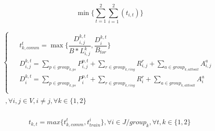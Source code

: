 \documentclass[conference]{IEEEtran}
\begin{document}
\begin{equation}
	\min\{\sum_{t=1}^{2}\sum_{i=1}^{2}(t_{i,t})\}
\end{equation}

\begin{equation}
	\begin{split}
		\begin{cases}
			\begin{aligned}
				& t_{k, comm}^{t} = \max\{\dfrac{D^{k, t}_{i,j}}{B * L^k_{i,j}}, \dfrac{D_i^{k, t}}{B_{tor}}\}\\
				& D^{k, t}_{i,j} = \sum_{p\in group_{k, ps}}P^{p,t}_{i,j} + \sum_{r\in group_{k, ring}}R^{r}_{i,j} + \sum_{a\in group_{k,alltoall}}A^{a}_{i,j}\\
				& D^{k, t}_i = \sum_{p\in group_{k, ps}}P^{p,t}_{i} + \sum_{r\in group_{k, ring}}R^{r}_{i} + \sum_{a\in group_{k,alltoall}}A^{a}_{i}\\
			\end{aligned}
		\end{cases}\\
		\begin{aligned}
			, \forall i, j\in V, i \neq j, \forall k\in \{1,2\}\\
		\end{aligned}
	\end{split}
\end{equation}

\begin{equation}
	t_{k,t} = max\{t_{k, comm}^{t}, t_{train}^i\}, \forall i \in J/group_k, \forall t,k \in \{1,2\}
\end{equation}
\end{document}
